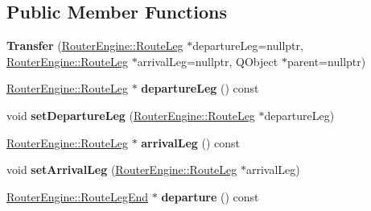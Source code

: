 \subsection*{Public Member Functions}
\begin{DoxyCompactItemize}
\item 
\mbox{\label{classRouterEngine_1_1Transfer_a4dfa4a9e6d843c7a2a050e0767560917}} 
{\bfseries Transfer} (\mbox{\hyperlink{classRouterEngine_1_1RouteLeg}{Router\+Engine\+::\+Route\+Leg}} $\ast$departure\+Leg=nullptr, \mbox{\hyperlink{classRouterEngine_1_1RouteLeg}{Router\+Engine\+::\+Route\+Leg}} $\ast$arrival\+Leg=nullptr, Q\+Object $\ast$parent=nullptr)
\item 
\mbox{\label{classRouterEngine_1_1Transfer_ab4ba2b3ce728923052331bf326fe5ee4}} 
\mbox{\hyperlink{classRouterEngine_1_1RouteLeg}{Router\+Engine\+::\+Route\+Leg}} $\ast$ {\bfseries departure\+Leg} () const
\item 
\mbox{\label{classRouterEngine_1_1Transfer_a0a21c2e3ea7d76323445a942820a36cc}} 
void {\bfseries set\+Departure\+Leg} (\mbox{\hyperlink{classRouterEngine_1_1RouteLeg}{Router\+Engine\+::\+Route\+Leg}} $\ast$departure\+Leg)
\item 
\mbox{\label{classRouterEngine_1_1Transfer_a1eb0676f65b56cb2669c5273524ee87d}} 
\mbox{\hyperlink{classRouterEngine_1_1RouteLeg}{Router\+Engine\+::\+Route\+Leg}} $\ast$ {\bfseries arrival\+Leg} () const
\item 
\mbox{\label{classRouterEngine_1_1Transfer_aaf6ae64e23f5b6a21b445c16810bdbd0}} 
void {\bfseries set\+Arrival\+Leg} (\mbox{\hyperlink{classRouterEngine_1_1RouteLeg}{Router\+Engine\+::\+Route\+Leg}} $\ast$arrival\+Leg)
\item 
\mbox{\label{classRouterEngine_1_1Transfer_a9de49b6229b08774c59a35e069241382}} 
\mbox{\hyperlink{classRouterEngine_1_1RouteLegEnd}{Router\+Engine\+::\+Route\+Leg\+End}} $\ast$ {\bfseries departure} () const
\item 
\mbox{\label{classRouterEngine_1_1Transfer_a07c651c052bcc4d12adf1d8fe8558473}} 

\end{DoxyCompactItemize}
